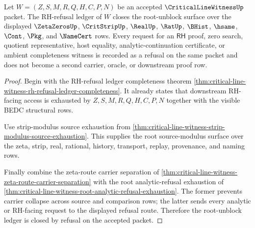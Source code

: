 \begin{theorem}
\label{thm:critical-line-witness-rh-refusal-ledger-closure}
Let $W=(Z,S,M,R,Q,H,C,P,N)$ be an accepted $\CriticalLineWitnessUp$ packet. The RH-refusal ledger of $W$ closes the root-unblock surface over the displayed $\ZetaZerosUp$, $\CritStripUp$, $\RealUp$, $\RatUp$, $\BHist$, $\hsame$, $\Cont$, $\Pkg$, and $\NameCert$ rows. Every request for an $\mathsf{RH}$ proof, zero search, quotient representative, host equality, analytic-continuation certificate, or ambient completeness witness is recorded as a refusal on the same packet and does not become a second carrier, oracle, or downstream proof row.
\end{theorem}
\begin{proof}
Begin with the RH-refusal ledger completeness theorem \autoref{thm:critical-line-witness-rh-refusal-ledger-completeness}. It already states that downstream RH-facing access is exhausted by $Z,S,M,R,Q,H,C,P,N$ together with the visible BEDC structural rows.

Use strip-modulus source exhaustion from \autoref{thm:critical-line-witness-strip-modulus-source-exhaustion}. This supplies the root source-modulus surface over the zeta, strip, real, rational, history, transport, replay, provenance, and naming rows.

Finally combine the zeta-route carrier separation of \autoref{thm:critical-line-witness-zeta-route-carrier-separation} with the root analytic-refusal exhaustion of \autoref{thm:critical-line-witness-root-analytic-refusal-exhaustion}. The former prevents carrier collapse across source and comparison rows; the latter sends every analytic or RH-facing request to the displayed refusal route. Therefore the root-unblock ledger is closed by refusal on the accepted packet.
\end{proof}
